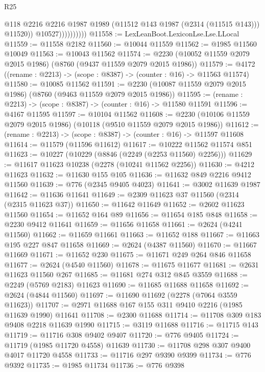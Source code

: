 \begin{lexlean}{R25}
\begin{coremodule}
                            @118
                            @2216
                            @2216
                            @1987
                            @1989
                            (@11512 @143 @1987 (@2314 (@11515 @143)))
                            @11520))
                        @10527))))))))))
@11558 := LexLeanBoot.LexiconLse.Lse.LLocal
@11559 := @11558 @2182
@11560 := @10044 @11559
@11562 := @1985 @11560 @10049
@11563 := @10043 @11562
@11574 := @2230 (@10052 @11559 @2079 @2015 @1986) (@8760 (@9437 @11559 @2079 @2015 @1986))
@11579 := @4172 ((rename : @2213) -> (scope : @8387) -> (counter : @16) -> @11563 @11574)
@11580 := @10085 @11562
@11591 := @2230 (@10087 @11559 @2079 @2015 @1986) (@8760 (@9463 @11559 @2079 @2015 @1986))
@11595 := (rename : @2213) -> (scope : @8387) -> (counter : @16) -> @11580 @11591
@11596 := @4167 @11595
@11597 := @10104 @11562
@11608 := @2230 (@10106 @11559 @2079 @2015 @1986) (@10118 (@9510 @11559 @2079 @2015 @1986))
@11612 := (rename : @2213) -> (scope : @8387) -> (counter : @16) -> @11597 @11608
@11614 := @11579 (@11596 @11612)
@11617 := @10222 @11562 @11574 @851
@11623 := @10227 (@10229 (@8846 (@2249 (@2253 @11560) @2256)))
@11629 := @11617 @11623 @10238 (@2278 (@10241 @11562 @2256))
@11630 := @4212 @11623
@11632 := @11630 @155 @105
@11636 := @11632 @849 @2216 @9412 @11560
@11639 := @776 (@2345 @9405 @4023)
@11641 := @3002 @11639 @1987
@11642 := @11636 @11641
@11649 := @2309 @11623 @37 @11560 (@2314 (@2315 @11623 @37))
@11650 := @11642 @11649
@11652 := @2602 @11623 @11560
@11654 := @11652 @164 @89
@11656 := @11654 @185 @848
@11658 := @2230 @9412 @11641
@11659 := @11656 @11658
@11661 := @2624 (@4241 @11560)
@11662 := @11659 @11661
@11663 := @11652 @188
@11667 := @11663 @195 @227 @847 @11658
@11669 := @2624 (@4387 @11560)
@11670 := @11667 @11669
@11671 := @11652 @230
@11675 := @11671 @249 @264 @846 @11658
@11677 := @2624 (@4540 @11560)
@11678 := @11675 @11677
@11681 := @2631 @11623 @11560 @267
@11685 := @11681 @274 @312 @845 @3559
@11688 := @2249 (@5769 @2183) @11623
@11690 := @11685 @11688 @11658
@11692 := @2624 (@4844 @11560)
@11697 := @11690 @11692 (@2278 (@7064 @3559 @11623))
@11707 := @2971 @11688 @167 @155 @311 @9410 @2216 (@1985 @11639 @1990) @11641
@11708 := @2300 @11688
@11714 := @11708 @309 @183 @9408 @2218 @11639 @1990
@11715 := @3119 @11688
@11716 := @11715 @143
@11719 := @11716 @308 @9402 @9407
@11720 := @776 @9405
@11724 := @11719 (@1985 @11720 @4558) @11639
@11730 := @11708 @298 @307 @9400 @4017 @11720 @4558
@11733 := @11716 @297 @9390 @9399
@11734 := @776 @9392
@11735 := @1985 @11734
@11736 := @776 @9398

\end{coremodule}
\end{lexlean}
